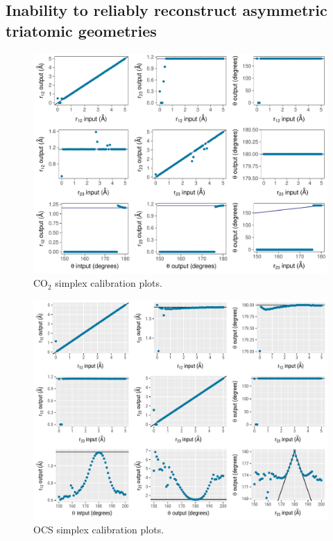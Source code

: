 \subsection{Inability to reliably reconstruct asymmetric triatomic geometries}

\begin{figure}
  \centering
  \includegraphics[width=\textwidth]{Plots/CO2SimplexCalibrationPlots}
  \caption[CO$_2$ simplex calibration plots.]
  {CO$_2$ simplex calibration plots.}
  \label{fig:CO2SimplexCalibrationPlots}
\end{figure}
\clearpage

\pagebreak
\begin{figure}
  \centering
  \includegraphics[width=\textwidth]{Plots/OCSSimplexCalibrationPlots}
  \caption[OCS simplex calibration plots.]
  {OCS simplex calibration plots.}
  \label{fig:OCSSimplexCalibrationPlots}
\end{figure}
\clearpage


